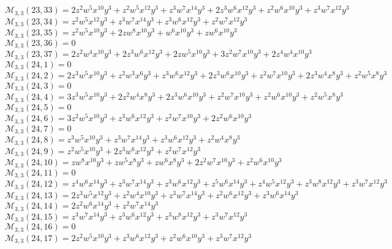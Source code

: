 $\mathcal{M}_{3,3}(23,33)=2z^2w^5x^{10}y^3+z^2w^5x^{12}y^3+z^3w^7x^{14}y^3+2z^3w^6x^{12}y^3+z^2w^6x^{10}y^3+z^3w^7x^{12}y^3$\\
$\mathcal{M}_{3,3}(23,34)=z^2w^5x^{12}y^3+z^3w^7x^{14}y^3+z^3w^6x^{12}y^3+z^2w^7x^{12}y^3$\\
$\mathcal{M}_{3,3}(23,35)=z^2w^5x^{10}y^3+2zw^8x^{10}y^3+w^6x^{10}y^3+zw^6x^{10}y^3$\\
$\mathcal{M}_{3,3}(23,36)=0$\\
$\mathcal{M}_{3,3}(23,37)=2z^2w^4x^{10}y^3+2z^3w^6x^{12}y^3+2zw^5x^{10}y^3+3z^2w^7x^{10}y^3+2z^4w^4x^{10}y^3$\\
$\mathcal{M}_{3,3}(24,1)=0$\\
$\mathcal{M}_{3,3}(24,2)=2z^3w^5x^{10}y^3+z^2w^3x^6y^3+z^3w^6x^{12}y^3+2z^3w^6x^{10}y^3+z^2w^7x^{10}y^3+2z^3w^4x^8y^3+z^2w^5x^8y^3$\\
$\mathcal{M}_{3,3}(24,3)=0$\\
$\mathcal{M}_{3,3}(24,4)=3z^3w^5x^{10}y^3+2z^2w^4x^8y^3+2z^3w^6x^{10}y^3+z^2w^7x^{10}y^3+z^2w^6x^{10}y^3+z^2w^5x^8y^3$\\
$\mathcal{M}_{3,3}(24,5)=0$\\
$\mathcal{M}_{3,3}(24,6)=3z^2w^5x^{10}y^3+z^3w^6x^{12}y^3+z^2w^7x^{10}y^3+2z^2w^6x^{10}y^3$\\
$\mathcal{M}_{3,3}(24,7)=0$\\
$\mathcal{M}_{3,3}(24,8)=z^3w^5x^{10}y^3+z^3w^7x^{14}y^3+z^3w^6x^{12}y^3+z^2w^4x^8y^3$\\
$\mathcal{M}_{3,3}(24,9)=z^2w^5x^{10}y^3+2z^3w^6x^{12}y^3+z^2w^7x^{12}y^3$\\
$\mathcal{M}_{3,3}(24,10)=zw^8x^{10}y^3+zw^5x^8y^3+zw^6x^8y^3+2z^2w^7x^{10}y^3+z^2w^6x^{10}y^3$\\
$\mathcal{M}_{3,3}(24,11)=0$\\
$\mathcal{M}_{3,3}(24,12)=z^4w^6x^{14}y^3+z^3w^7x^{14}y^3+z^3w^6x^{12}y^3+z^5w^6x^{14}y^3+z^4w^5x^{12}y^3+z^3w^8x^{12}y^3+z^3w^7x^{12}y^3$\\
$\mathcal{M}_{3,3}(24,13)=2z^3w^5x^{12}y^3+z^2w^4x^{10}y^3+z^3w^7x^{14}y^3+z^2w^6x^{12}y^3+z^3w^6x^{14}y^3$\\
$\mathcal{M}_{3,3}(24,14)=2z^2w^6x^{14}y^3+z^2w^7x^{14}y^3$\\
$\mathcal{M}_{3,3}(24,15)=z^3w^7x^{14}y^3+z^3w^6x^{12}y^3+z^3w^8x^{12}y^3+z^3w^7x^{12}y^3$\\
$\mathcal{M}_{3,3}(24,16)=0$\\
$\mathcal{M}_{3,3}(24,17)=2z^2w^5x^{10}y^3+z^3w^6x^{12}y^3+z^2w^6x^{10}y^3+z^3w^7x^{12}y^3$\\
